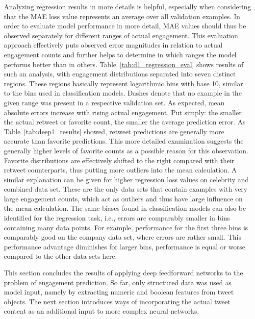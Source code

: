Analyzing regression results in more details is helpful, especially when considering
that the MAE loss value represents an average over all validation examples.
In order to evaluate model performance in more detail, MAE values should thus be
observed separately for different ranges of actual engagement.
This evaluation approach effectively puts observed error magnitudes in relation
to actual engagement counts and further helps to determine in which ranges 
the model performs better than in others.
Table~\ref{tab:d1_regression_eval} shows results of such an analysis, with
engagement distributions separated into seven distinct regions.
These regions basically represent logarithmic bins with base 10, similar to
the bins used in classification models.
Dashes denote that no example in the given range was present in a respective
validation set.
As expected, mean absolute errors increase with rising actual engagement.
Put simply: the smaller the actual retweet or favorite count, the smaller the
average prediction error.
As Table~\ref{tab:deep1_results} showed, retweet predictions are generally more
accurate than favorite predictions.
This more detailed examination suggests the generally higher levels of favorite
counts as a possible reason for this observation.
Favorite distributions are effectively shifted to the right compared with their
retweet counterparts, thus putting more outliers into the mean calculation.
A similar explanation can be given for higher regression loss values on
celebrity and combined data set.
These are the only data sets that contain examples with very large engagement
counts, which act as outliers and thus have large influence on the mean
calculation.
The same biases found in classification models can also be identified for the
regression task, i.e., errors are comparably smaller in bins containing many data points.
For example, performance for the first three bins is comparably good on the company data
set, where errors are rather small.
This performance advantage diminishes for larger bins, performance is equal or
worse compared to the other data sets here.

This section concludes the results of applying deep feedforward networks to
the problem of engagement prediction. 
So far, only structured data was used as model input, namely by extracting
numeric and boolean features from tweet objects.
The next section introduces ways of incorporating the actual tweet content as
an additional input to more complex neural networks.

